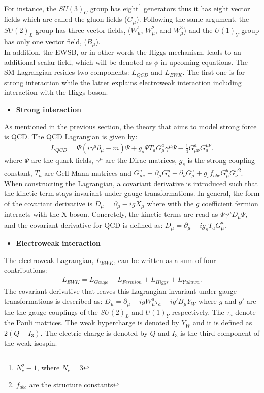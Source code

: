 For instance, the $SU(3)_C$ group has eight\footnote{$N_c^2-1$, where $N_c=3$} generators thus it has eight vector fields which are called the gluon fields ($G_{\mu}$). Following the same argument, the $SU(2)_L$  group has three vector fields, ($W_{\mu}^1$, $ W_{\mu}^2$, and $ W_{\mu}^3$) and the $U(1)_Y$ group has only one vector field, ($B_{\mu}$). \\
In addition, the EWSB, or in other words the Higgs mechanism, leads to an additional scalar field, which will be denoted as $\phi$ in upcoming equations. 
The SM Lagrangian resides two components: $L_{QCD}$ and $L_{EWK}$. The first one is for strong interaction while the latter explains electroweak interaction including interaction with the Higgs boson. 
\begin{itemize}
  \item \textbf{Strong interaction}
\end{itemize}
As mentioned in the previous section, the theory that aims to model strong force is QCD. The QCD Lagrangian is given by:
\begin{eqnarray}
\label{LagQCD}
{L_{QCD}} = {\bar{\Psi}(i\gamma^{\mu}\partial_{\mu}-m)\Psi + g_s\bar{\Psi}T_aG_{\mu}^a\gamma^{\mu}\Psi - \frac{1}{4}G_{\mu\nu}^aG^{\mu\nu}_a}.
\end{eqnarray}
where $\Psi$ are the quark fields, $\gamma^{\mu}$ are the Dirac matrices, $g_s$ is the strong coupling constant, $T_a$ are Gell-Mann matrices and $G_{\mu\nu}^a \equiv \partial_{\mu}G_{\nu}^a - \partial_{\nu}G_{\mu}^a + g_sf_{abc}G_{\mu}^bG_{\nu}^c$\footnote{$f_{abc}$ are the structure constants}.
When constructing the Lagrangian, a covariant derivative is introduced such that the kinetic term stays invariant under gauge transformations. In general, the form of the covariant derivative is $D_{\mu}=\partial_{\mu}-igX_{\mu}$ where with the $g$ coefficient fermion interacts with the X boson. Concretely, the kinetic terms are read as $\bar{\Psi}\gamma^{\mu}D_{\mu}\Psi$, and the covariant derivative for QCD is defined as: $D_{\mu}=\partial_{\mu}-ig_sT_aG_{\mu}^a$.
\begin{itemize}
  \item \textbf{Electroweak interaction}
\end{itemize}

The electroweak Lagrangian, $L_{EWK}$, can be written as a sum of four contributions:
\begin{eqnarray}
\label{LagEWK1}
{L_{EWK} = L_{Gauge}+L_{Fermion}+L_{Higgs}+L_{Yukawa}}.
\end{eqnarray}
The covariant derivative that leaves this Lagrangian invariant under gauge transformations is described as: $D_{\mu}=\partial_{\mu}-igW_{\mu}^a\tau_a - ig'B_{\mu}Y_W$ where $g$ and $g'$ are the the gauge couplings of the $S U(2)_L$ and $U(1)_Y$ respectively. The $\tau_a$ denote the Pauli matrices. The weak hypercharge is denoted by $Y_W$ and it is defined as $2(Q-I_3)$. The electric charge is denoted by $Q$ and $I_3$ is the third component of the weak isospin.

